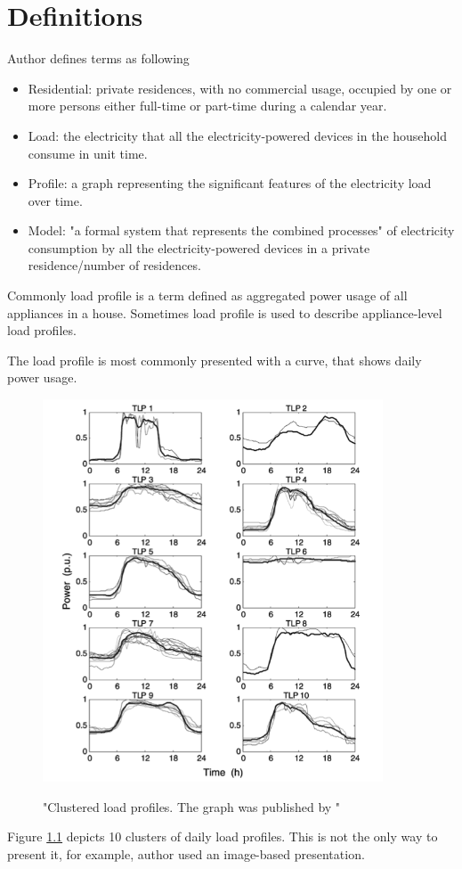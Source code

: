 \label{chapter2}
\chapter{Definitions}

Author \cite{Review2021} defines terms as following

\begin{itemize}
	\item Residential: private residences, with no commercial usage, occupied by one or more persons either full-time or part-time during a calendar year.
	\item Load: the electricity that all the electricity-powered devices in the household consume in unit time.
	\item Profile: a graph representing the significant features of the electricity load over time.
	\item Model: "a formal system that represents the combined processes" \cite{KAVOUSIAN2013184} of electricity consumption by all the electricity-powered devices in a private residence/number of residences.
\end{itemize}

Commonly load profile is a term defined as aggregated power usage of all appliances in a house. 
Sometimes load profile is used to describe appliance-level load profiles. 

The load profile is most commonly presented with a curve, that shows daily power usage.

\begin{figure}[H]
	\centering
	\caption{"Clustered load profiles. The graph was published by \protect\cite{GERBEC2005}"}
	\includegraphics[width=0.9\textwidth]{Figures/clustered_profiles.png}
	\label{fig:profiles}
\end{figure}

Figure \ref{fig:profiles} depicts 10 clusters of daily load profiles. 
This is not the only way to present it, for example, author \cite{Park2019} used an image-based presentation.


